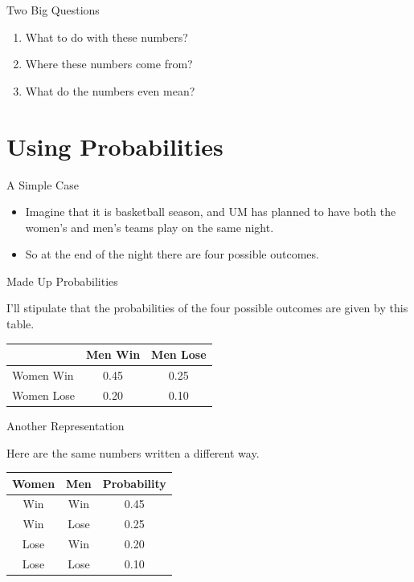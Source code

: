 \documentclass[
  ignorenonframetext,
]{beamer}
\providecommand{\tightlist}{%
  \setlength{\itemsep}{0pt}\setlength{\parskip}{0pt}}
\renewcommand{\,}{\text{, }}
\begin{document}
\begin{frame}{Two Big Questions}
\protect\hypertarget{two-big-questions}{}

\begin{enumerate}[<+->]
\tightlist
\item
  What to do with these numbers?
\item
  Where these numbers come from?
\item
  What do the numbers even mean?
\end{enumerate}

\end{frame}

\hypertarget{using-probabilities}{%
\section{Using Probabilities}\label{using-probabilities}}

\begin{frame}{A Simple Case}
\protect\hypertarget{a-simple-case}{}

\begin{itemize}
\tightlist
\item
  Imagine that it is basketball season, and UM has planned to have both
  the women's and men's teams play on the same night.
\item
  So at the end of the night there are four possible outcomes.
\end{itemize}

\end{frame}

\begin{frame}{Made Up Probabilities}
\protect\hypertarget{made-up-probabilities}{}

I'll stipulate that the probabilities of the four possible outcomes are
given by this table.

\begin{longtable}[]{@{}lcc@{}}
\toprule
& Men Win & Men Lose\tabularnewline
\midrule
\endhead
Women Win & 0.45 & 0.25\tabularnewline
Women Lose & 0.20 & 0.10\tabularnewline
\bottomrule
\end{longtable}

\end{frame}

\begin{frame}{Another Representation}
\protect\hypertarget{another-representation}{}

Here are the same numbers written a different way.

\begin{longtable}[]{@{}ccc@{}}
\toprule
Women & Men & Probability\tabularnewline
\midrule
\endhead
Win & Win & 0.45\tabularnewline
Win & Lose & 0.25\tabularnewline
Lose & Win & 0.20\tabularnewline
Lose & Lose & 0.10\tabularnewline
\bottomrule
\end{longtable}

\end{frame}
\end{document}
